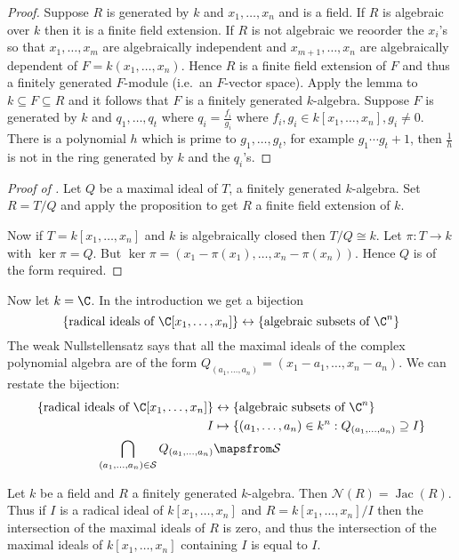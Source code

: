 \documentclass[a4paper]{article}
\newcommand{\nilrad}[1]{\mathcal{N}({#1})} %
\newcommand{\jac}[1]{\operatorname{Jac}({#1})} %
\begin{document}
\begin{proof}
  Suppose \(R\) is generated by \(k\) and \(x_1, \dots, x_n\) and is a field. If \(R\) is algebraic over \(k\) then it is a finite field extension. If \(R\) is not algebraic we reoorder the \(x_i\)'s so that \(x_1, \dots, x_m\) are algebraically independent and \(x_{m + 1}, \dots, x_n\) are algebraically dependent of \(F = k(x_1, \dots, x_n)\). Hence \(R\) is a finite field extension of \(F\) and thus a finitely generated \(F\)-module (i.e.\ an \(F\)-vector space). Apply the lemma to \(k \subseteq F \subseteq R\) and it follows that \(F\) is a finitely generated \(k\)-algebra. Suppose \(F\) is generated by \(k\) and \(q_1, \dots, q_t\) where \(q_i = \frac{f_i}{g_i}\) where \(f_i, g_i \in k[x_1, \dots, x_n], g_i \neq 0\). There is a polynomial \(h\) which is prime to \(g_1, \dots, g_t\), for example \(g_1 \cdots g_t + 1\), then \(\frac{1}{h}\) is not in the ring generated by \(k\) and the \(q_i\)'s.
\end{proof}

\begin{proof}[Proof of ]
  Let \(Q\) be a maximal ideal of \(T\), a finitely generated \(k\)-algebra. Set \(R = T/Q\) and apply the proposition to get \(R\) a finite field extension of \(k\).

  Now if \(T = k[x_1, \dots, x_n]\) and \(k\) is algebraically closed then \(T/Q \cong k\). Let \(\pi: T \to k\) with \(\ker \pi = Q\). But \(\ker \pi = (x_1 - \pi(x_1), \dots, x_n - \pi(x_n))\). Hence \(Q\) is of the form required.
\end{proof}

Now let \(k = \C\). In the introduction we get a bijection
\[
  \{\text{radical ideals of } \C[x_1, \dots, x_n]\} \leftrightarrow \{\text{algebraic subsets of } \C^n\}
\]
The weak Nullstellensatz says that all the maximal ideals of the complex polynomial algebra are of the form \(Q_{(a_1, \dots, a_n)} = (x_1 - a_1, \dots, x_n - a_n)\). We can restate the bijection:
\begin{align*}
  \{\text{radical ideals of } \C[x_1, \dots, x_n]\} &\leftrightarrow \{\text{algebraic subsets of } \C^n\} \\
  I &\mapsto \{(a_1, \dots, a_n) \in k^n: Q_{(a_1, \dots, a_n)} \supseteq I\} \\
  \bigcap_{(a_1, \dots, a_n) \in \mathcal S} Q_{(a_1, \dots, a_n)} &\mapsfrom \mathcal S
\end{align*}

\begin{theorem}
  \label{thm:nilradical equals to Jacobson radical}
  Let \(k\) be a field and \(R\) a finitely generated \(k\)-algebra. Then \(\nilrad R = \jac R\). Thus if \(I\) is a radical ideal of \(k[x_1, \dots, x_n]\) and \(R = k[x_1, \dots, x_n]/I\) then the intersection of the maximal ideals of \(R\) is zero, and thus the intersection of the maximal ideals of \(k[x_1, \dots, x_n]\) containing \(I\) is equal to \(I\).
\end{theorem}
\end{document}
